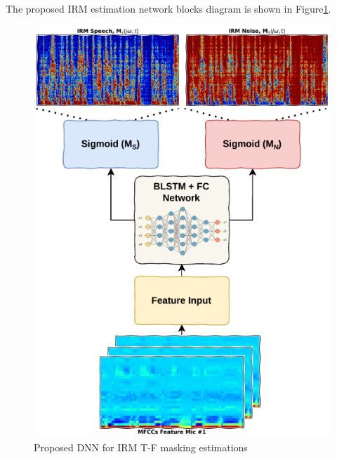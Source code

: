The proposed IRM estimation network blocks diagram is shown in 
Figure\;\ref{fig:irm_nn}.

\begin{figure}[H]
    \centering
    \includegraphics[width=0.75\linewidth]{Beamformers/images/irm_nn}
    \caption{Proposed DNN for IRM T-F masking estimations}\label{fig:irm_nn}
\end{figure}


